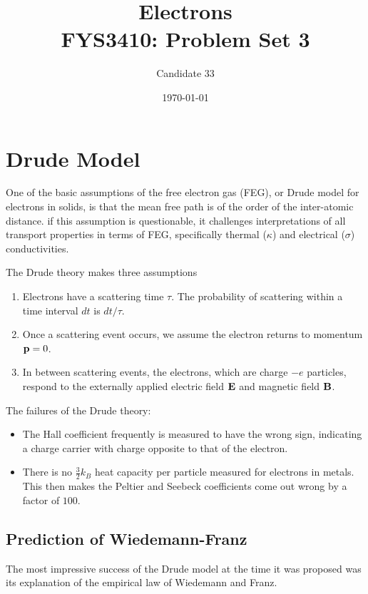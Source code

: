 \documentclass[11pt]{amsart}
\title[Problem Set 3]{Electrons \\
		\hrulefill \small{ FYS3410: Problem Set 3 } \hrulefill}
\author{Candidate 33}
\date{\today}
\begin{document}
\maketitle

\section{Drude Model}
One of the basic assumptions of the free electron gas (FEG), or Drude model for electrons in solids, is that the mean free path is of the order of the inter-atomic distance. if this  assumption is questionable, it challenges interpretations of all transport properties in terms of FEG, specifically thermal ($\kappa$) and electrical ($\sigma$) conductivities.

The Drude theory makes three assumptions
\begin{enumerate}
\item Electrons have a scattering time $\tau$. The probability of scattering within a time interval $dt$ is $dt/\tau$.
\item Once a scattering event occurs, we assume the electron returns to momentum $\vb{p} = 0$.
\item In between scattering events, the electrons, which are charge $-e$ particles, respond to the externally applied electric field $\vb{E}$ and magnetic field $\vb{B}$.
\end{enumerate}

The failures of the Drude theory:
\begin{itemize}
\item The Hall coefficient frequently is measured to have the wrong sign, indicating a charge carrier with charge opposite to that of the electron.
\item There is no $\frac{3}{2}k_B$ heat capacity per particle measured for electrons in metals. This then makes the Peltier and Seebeck coefficients come out wrong by a factor of $100$.
\end{itemize}

\subsection{Prediction of Wiedemann-Franz}
The most impressive success of the Drude model at the time it was proposed was its explanation of the empirical law of Wiedemann and Franz. 
\end{document}
